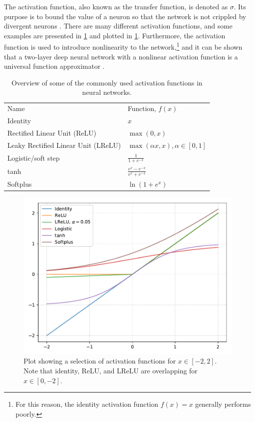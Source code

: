 The activation function, also known as the transfer function, is denoted as $\sigma$. Its purpose is to bound the value of a neuron so that the network is not crippled by divergent neurons \cite[81]{Wang2003}. There are many different activation functions, and some examples are presented in \cref{tab:activationfunctions} and plotted in \cref{fig:activationfunctions}. Furthermore, the activation function is used to introduce nonlinearity to the network,\footnote{For this reason, the identity activation function $f(x)=x$ generally performs poorly.} and it can be shown that a two-layer deep neural network with a nonlinear activation function is a universal function approximator \cite{Cybenko1989}. 

\begin{table}[htbp]
    \centering
    \caption[Activation functions]{Overview of some of the commonly used activation functions in neural networks. }
    \label{tab:activationfunctions}
    \begin{tabular}{ll}
    \hline
    Name & Function, $f(x)$ \\
    \hhline{==}
    Identity & $x$ \\
    Rectified Linear Unit (ReLU) & $\max\left(0, x\right)$ \\
    Leaky Rectified Linear Unit (LReLU) & $\max\left(\alpha x, x\right), \alpha\in[0,1]$ \\
    Logistic/soft step & $\frac{1}{1+e^{-x}}$  \\
    tanh & $\frac{e^x - e^{-x}}{e^x + e^{-x}}$ \\
    Softplus & $\ln\left(1+e^x\right)$ \\
    \hline
    \end{tabular}
\end{table}

\begin{figure}[htbp]  
    \centering
    \includegraphics[width=.8\textwidth]{figures/activationfunctions.pdf}
    \caption[Activation functions]{Plot showing a selection of activation functions for $x\in[-2,2]$. Note that identity, ReLU, and LReLU are overlapping for $x\in[0,-2]$. }
    \label{fig:activationfunctions}
\end{figure}

